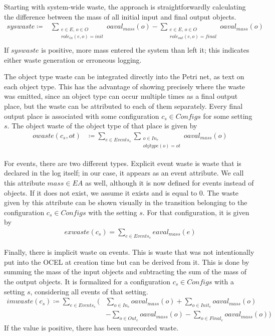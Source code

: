 Starting with system-wide waste, the approach is straightforwardly calculating the difference between the mass of all initial input and final output objects.
\begin{align*}
    syswaste \coloneqq  &\sum_{\substack{e \in E,\, o \in O \\ role_{in}(e, o) = init}} oaval_{mass}(o) - \sum_{\substack{e \in E,\, o \in O \\ role_{out}(e, o) = final}} oaval_{mass}(o) \\
\end{align*}
If $syswaste$ is positive, more mass entered the system than left it; this indicates either waste generation or erroneous logging.



The object type waste can be integrated directly into the Petri net, as text on each object type.
This has the advantage of showing precisely where the waste was emitted, since an object type can occur multiple times as a final output place, but the waste can be attributed to each of them separately.
Every final output place is associated with some configuration $c_s \in \mathit{Configs}$ for some setting $s$.
The object waste of the object type of that place is given by
\begin{align*}
    owaste(c_s, ot) &\coloneqq \sum_{e \in \mathit{Events}_s} \sum_{\substack{o \in \mathit{In}_e \\ objtype(o) = ot}} oaval_{mass}(o)
\end{align*}




For events, there are two different types.
Explicit event waste is waste that is declared in the log itself; in our case, it appears as an event attribute.
We call this attribute $mass \in EA$ as well, although it is now defined for events instead of objects.
If it does not exist, we assume it exists and is equal to $0$.
The waste given by this attribute can be shown visually in the transition belonging to the configuration $c_s \in \mathit{Configs}$ with the setting $s$.
For that configuration, it is given by
\begin{align*}
    exwaste(c_s) = \sum_{e \in \mathit{Events}_s} eaval_{mass}(e)
\end{align*}



Finally, there is implicit waste on events.
This is waste that was not intentionally put into the OCEL at creation time but can be derived from it.
This is done by summing the mass of the input objects and subtracting the sum of the mass of the output objects.
It is formalized for a configuration $c_s \in \mathit{Configs}$ with a setting $s$, considering all events of that setting.
\begin{align*}
    imwaste(c_s) \coloneqq \sum_{e \in \mathit{Events}_s} \bigg( &\sum_{o \in \mathit{In}_e} oaval_{mass}(o) + \sum_{o \in \mathit{Init}_e} oaval_{mass}(o) \\ 
    &- \sum_{o \in \mathit{Out}_e} oaval_{mass}(o) - \sum_{o \in \mathit{Final}_e} oaval_{mass}(o) \bigg)
\end{align*}
If the value is positive, there has been unrecorded waste.



